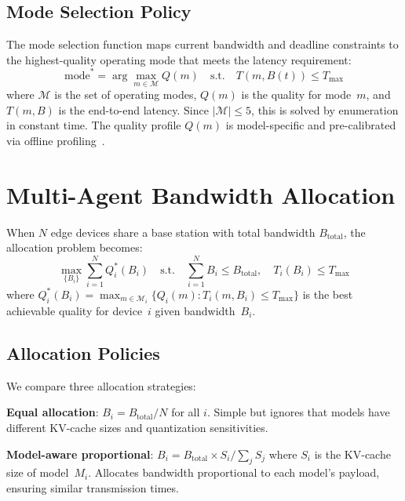 \documentclass[conference]{IEEEtran}
\begin{document}
\subsection{Mode Selection Policy}

The mode selection function maps current bandwidth and deadline constraints to the highest-quality operating mode that meets the latency requirement:
\begin{equation}
    \text{mode}^* = \arg\max_{m \in \mathcal{M}} Q(m) \quad \text{s.t.} \quad T(m, B(t)) \leq T_{\max}
    \label{eq:mode_select}
\end{equation}
where $\mathcal{M}$ is the set of operating modes, $Q(m)$ is the quality for mode~$m$, and $T(m, B)$ is the end-to-end latency.
Since $|\mathcal{M}| \leq 5$, this is solved by enumeration in constant time.
The quality profile $Q(m)$ is model-specific and pre-calibrated via offline profiling~\cite{paperA}.


\section{Multi-Agent Bandwidth Allocation}
\label{sec:multiagent}

When $N$ edge devices share a base station with total bandwidth $B_{\text{total}}$, the allocation problem becomes:
\begin{equation}
    \max_{\{B_i\}} \sum_{i=1}^{N} Q_i^*(B_i)
    \quad \text{s.t.} \quad \sum_{i=1}^{N} B_i \leq B_{\text{total}}, \quad T_i(B_i) \leq T_{\max}
    \label{eq:multiagent}
\end{equation}
where $Q_i^*(B_i) = \max_{m \in \mathcal{M}_i} \{Q_i(m) : T_i(m, B_i) \leq T_{\max}\}$ is the best achievable quality for device~$i$ given bandwidth~$B_i$.

\subsection{Allocation Policies}

We compare three allocation strategies:

\textbf{Equal allocation}: $B_i = B_{\text{total}} / N$ for all $i$.
Simple but ignores that models have different KV-cache sizes and quantization sensitivities.

\textbf{Model-aware proportional}: $B_i = B_{\text{total}} \times S_i / \sum_j S_j$ where $S_i$ is the KV-cache size of model~$M_i$.
Allocates bandwidth proportional to each model's payload, ensuring similar transmission times.
\end{document}
